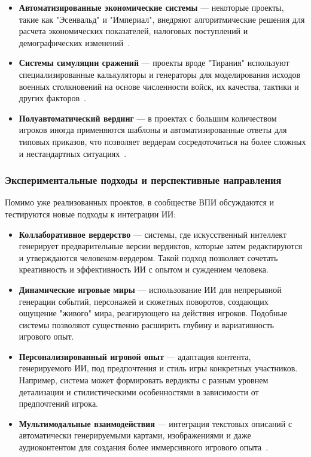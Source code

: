 \begin{itemize}
    \item \textbf{Автоматизированные экономические системы} — некоторые проекты, такие как "{}Эсенвальд"{} и "{}Империал"{}, внедряют алгоритмические решения для расчета экономических показателей, налоговых поступлений и демографических изменений~\cite{wpg-automation}.

    \item \textbf{Системы симуляции сражений} — проекты вроде "{}Тирания"{} используют специализированные калькуляторы и генераторы для моделирования исходов военных столкновений на основе численности войск, их качества, тактики и других факторов~\cite{battle-automation}.

    \item \textbf{Полуавтоматический вердинг} — в проектах с большим количеством игроков иногда применяются шаблоны и автоматизированные ответы для типовых приказов, что позволяет вердерам сосредоточиться на более сложных и нестандартных ситуациях~\cite{wpg-semiauto}.
\end{itemize}

\subsubsection{Экспериментальные подходы и перспективные направления}

Помимо уже реализованных проектов, в сообществе ВПИ обсуждаются и тестируются новые подходы к интеграции ИИ:

\begin{itemize}
    \item \textbf{Коллаборативное вердерство} — системы, где искусственный интеллект генерирует предварительные версии вердиктов, которые затем редактируются и утверждаются человеком-вердером. Такой подход позволяет сочетать креативность и эффективность ИИ с опытом и суждением человека.

    \item \textbf{Динамические игровые миры} — использование ИИ для непрерывной генерации событий, персонажей и сюжетных поворотов, создающих ощущение "{}живого"{} мира, реагирующего на действия игроков. Подобные системы позволяют существенно расширить глубину и вариативность игрового опыт.

    \item \textbf{Персонализированный игровой опыт} — адаптация контента, генерируемого ИИ, под предпочтения и стиль игры конкретных участников. Например, система может формировать вердикты с разным уровнем детализации и стилистическими особенностями в зависимости от предпочтений игрока.

    \item \textbf{Мультимодальные взаимодействия} — интеграция текстовых описаний с автоматически генерируемыми картами, изображениями и даже аудиоконтентом для создания более иммерсивного игрового опыта~\cite{catalogwpg2023}.
\end{itemize}


